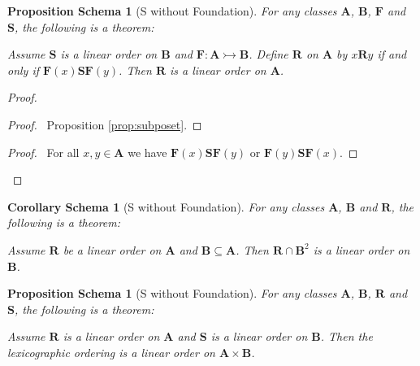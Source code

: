 \documentclass{book}
\let\qed\relax
\newtheorem{props}[ax]{Proposition Schema}
\newtheorem{cors}{Corollary Schema}[ax]
\theoremstyle{definition}
\begin{document}
\begin{props}[S without Foundation]
\label{prop:subloset}
For any classes $\mathbf{A}$, $\mathbf{B}$, $\mathbf{F}$ and $\mathbf{S}$, the following is a theorem:

Assume $\mathbf{S}$ is a linear order on $\mathbf{B}$ and $\mathbf{F} : \mathbf{A} \rightarrowtail \mathbf{B}$. Define $\mathbf{R}$ on $\mathbf{A}$ by $x \mathbf{R} y$ if and only if $\mathbf{F}(x) \mathbf{S} \mathbf{F}(y)$. Then $\mathbf{R}$ is a linear order on $\mathbf{A}$.
\end{props}

\begin{proof}
\pf
{}
\begin{proof}
	\pf\ Proposition \ref{prop:subposet}.
\end{proof}
\begin{proof}
	\pf\ For all $x,y \in \mathbf{A}$ we have $\mathbf{F}(x) \mathbf{S} \mathbf{F}(y)$ or $\mathbf{F}(y) \mathbf{S} \mathbf{F}(x)$.
\end{proof}
\qed
\end{proof}

\begin{cors}[S without Foundation]
\label{cor:subloset}
For any classes $\mathbf{A}$, $\mathbf{B}$ and $\mathbf{R}$, the following is a theorem:

Assume $\mathbf{R}$ be a linear order on $\mathbf{A}$ and $\mathbf{B} \subseteq \mathbf{A}$. Then $\mathbf{R} \cap \mathbf{B}^2$ is a linear order on $\mathbf{B}$.
\end{cors}

\begin{props}[S without Foundation]
\label{prop:lexicographlinear}
For any classes $\mathbf{A}$, $\mathbf{B}$, $\mathbf{R}$ and $\mathbf{S}$, the following is a theorem:

Assume $\mathbf{R}$ is a linear order on $\mathbf{A}$ and $\mathbf{S}$ is a linear order on $\mathbf{B}$. Then the lexicographic ordering is a linear order on $\mathbf{A} \times \mathbf{B}$.
\end{props}
\end{document}
